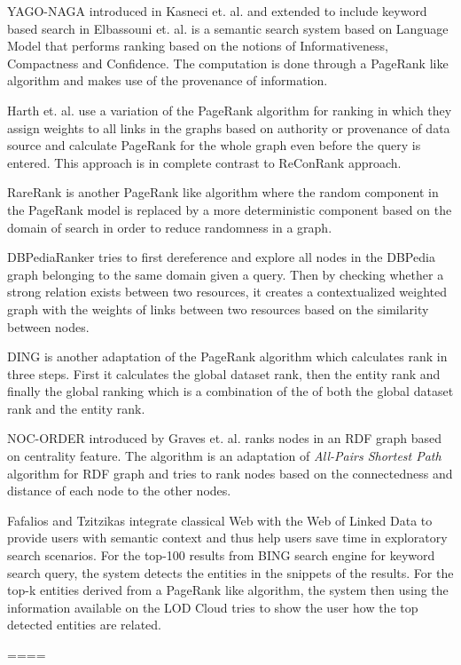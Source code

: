 {YAGO-NAGA introduced in Kasneci et. al.\cite{kasneci2008naga}
and extended to include keyword based search in
Elbassouni et. al.\cite{elbassuoni2009language} is
a semantic search system based on Language Model that
performs ranking based on the notions of Informativeness,
Compactness and Confidence.
The computation is done through a PageRank
like algorithm and
makes use of the provenance of information.

Harth et. al.\cite{harth2009using} use a variation
of the PageRank algorithm for ranking in which
they assign weights to all links in the graphs
based on authority or provenance of data source
and calculate PageRank for the whole
graph even before the query is entered.
This approach is in complete contrast
to ReConRank\cite{hogan2006reconrank} approach.

RareRank\cite{wei2009semantic} is another PageRank
like algorithm where the random component
in the PageRank model is replaced by
a more deterministic component based on
the domain of search in order to reduce randomness in a graph.

DBPediaRanker\cite{mirizzi2010ranking} tries to
first dereference and explore all nodes in the
DBPedia graph belonging to the same
domain given a query. Then by checking whether
a strong relation exists between two resources,
it creates a contextualized weighted graph
with the weights of links between two resources
based on the similarity between nodes.

DING\cite{delbru2010hierarchical} is another adaptation
of the PageRank algorithm which calculates rank in three steps.
First it calculates the global dataset rank,
then the entity rank and finally the global ranking
which is a combination of the of both the global
dataset rank and the entity rank.

NOC-ORDER\cite{graves2008method} introduced by
Graves et. al. ranks nodes in an RDF graph
based on centrality feature.
The algorithm is an adaptation of \emph{All-Pairs Shortest Path}
algorithm for RDF graph and tries to
rank nodes based on the connectedness
and distance of each node to the other nodes.

Fafalios and Tzitzikas\cite{fafalios2014post} integrate
classical Web with the Web of Linked Data to provide
users with semantic context and thus help users save
time in exploratory search scenarios.
For the top-100 results from BING search engine
for keyword search query, the system detects the entities in the snippets of the
results. For the top-k entities derived from a PageRank like algorithm,
the system then using the information available
on the LOD Cloud tries
to show the user how the top detected entities are related.

====}

